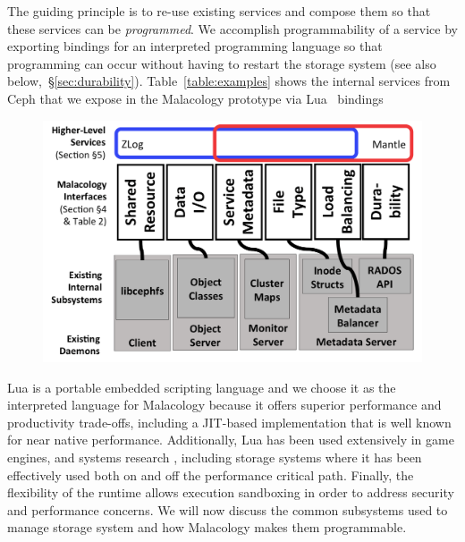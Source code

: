 The guiding principle is to re-use existing services and compose them so that
these services can be \emph{programmed}. We accomplish programmability of a
service by exporting bindings for an interpreted programming
language so that programming can occur without having to restart the storage
system (see also below,~\S\ref{sec:durability}). Table~\ref{table:examples}
shows the internal services from Ceph that we expose in the Malacology
prototype via Lua~\cite{ierusalimschy1996lua} bindings
 

\begin{figure}[tbp]
\centering
\includegraphics{figures/implementation-overview.png}
\caption{
\label{fig:implementation-overview}}
\end{figure}

Lua is a portable embedded scripting language and we choose it as the
interpreted language for Malacology because it offers superior performance and
productivity trade-offs, including a JIT-based implementation that is well
known for near native performance. Additionally, Lua has been used extensively
in game engines, and systems research \cite{neto:dls14-luaos}, including
storage systems where it has been effectively used both on
\cite{grawinkel:pdsw2012-lua,watkins2013:bdmc13-in-vivo,geambasu_comet_2010}
and off \cite{sevilla:sc15-mantle} the performance critical path. Finally, the
flexibility of the runtime allows execution sandboxing in order to address
security and performance concerns. We will now discuss the common subsystems
used to manage storage system and how Malacology makes them programmable.

